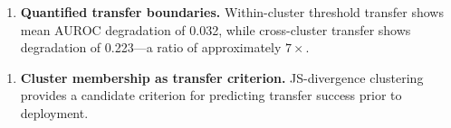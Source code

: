 \begin{enumerate}
\item \textbf{Quantified transfer boundaries.} Within-cluster threshold transfer shows mean AUROC degradation of 0.032, while cross-cluster transfer shows degradation of 0.223---a ratio of approximately $7\times$.
\end{enumerate}

\begin{enumerate}
\item \textbf{Cluster membership as transfer criterion.} JS-divergence clustering provides a candidate criterion for predicting transfer success prior to deployment.
\end{enumerate}

